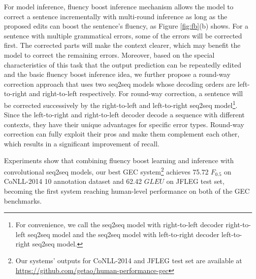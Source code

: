 \documentclass{article} %
\begin{document}



For model inference, fluency boost inference mechanism allows the model to correct a sentence incrementally with multi-round inference as long as the proposed edits can boost the sentence's fluency, as Figure \ref{fig:fb}(b) shows. For a sentence with multiple grammatical errors, some of the errors will be corrected first. The corrected parts will make the context clearer, which may benefit the model to correct the remaining errors. Moreover, based on the special characteristics of this task that the output prediction can be repeatedly edited and the basic fluency boost inference idea, we further propose a round-way correction approach that uses two seq2seq models whose decoding orders are left-to-right and right-to-left respectively. For round-way correction, a sentence will be corrected successively by the right-to-left and left-to-right seq2seq model\footnote{For convenience, we call the seq2seq model with right-to-left decoder right-to-left seq2seq model and the seq2seq model with left-to-right decoder left-to-right seq2seq model.}. Since the left-to-right and right-to-left decoder decode a sequence with different contexts, they have their unique advantages for specific error types. Round-way correction can fully exploit their pros and make them complement each other, which results in a significant improvement of recall.

Experiments show that combining fluency boost learning and inference with convolutional seq2seq models, our best GEC system\footnote{Our systems' outputs for CoNLL-2014 and JFLEG test set are available at \url{https://github.com/getao/human-performance-gec}} achieves 75.72 $F_{0.5}$ on CoNLL-2014 10 annotation dataset and 62.42 $GLEU$ on JFLEG test set, becoming the first system reaching human-level performance on both of the GEC benchmarks.
\end{document}
